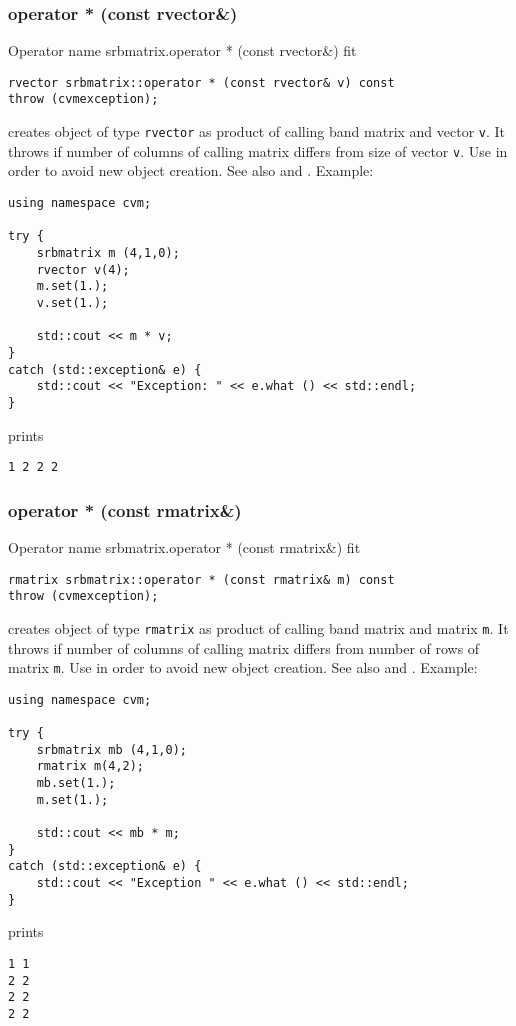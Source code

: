 \subsubsection{operator * (const rvector\&)}
Operator%
\pdfdest name {srbmatrix.operator * (const rvector&)} fit
\begin{verbatim}
rvector srbmatrix::operator * (const rvector& v) const
throw (cvmexception);
\end{verbatim}
creates  object of type \verb"rvector"
as  product of  calling band matrix and  vector \verb"v".
It throws  
if number of columns of  calling matrix
differs from  size of  vector \verb"v".
Use 
in order to avoid new object creation.
See also
 and .
Example:
\begin{Verbatim}
using namespace cvm;

try {
    srbmatrix m (4,1,0);
    rvector v(4);
    m.set(1.);
    v.set(1.);

    std::cout << m * v;
}
catch (std::exception& e) {
    std::cout << "Exception: " << e.what () << std::endl;
}
\end{Verbatim}
prints
\begin{Verbatim}
1 2 2 2
\end{Verbatim}
\newpage



\subsubsection{operator * (const rmatrix\&)}
Operator%
\pdfdest name {srbmatrix.operator * (const rmatrix&)} fit
\begin{verbatim}
rmatrix srbmatrix::operator * (const rmatrix& m) const
throw (cvmexception);
\end{verbatim}
creates  object of type \verb"rmatrix"
as  product of  calling band matrix and  matrix \verb"m".
It throws  
if  number of columns of  calling matrix
differs from  number of rows of  matrix \verb"m".
Use  in order to avoid
 new object creation.
See also
 and .
Example:
\begin{Verbatim}
using namespace cvm;

try {
    srbmatrix mb (4,1,0);
    rmatrix m(4,2);
    mb.set(1.);
    m.set(1.);

    std::cout << mb * m;
}
catch (std::exception& e) {
    std::cout << "Exception " << e.what () << std::endl;
}
\end{Verbatim}
prints
\begin{Verbatim}
1 1
2 2
2 2
2 2
\end{Verbatim}
\newpage




